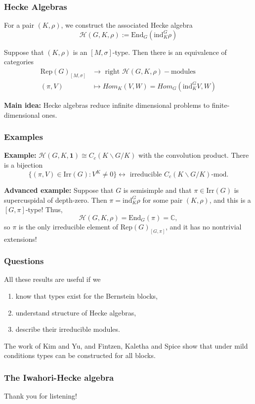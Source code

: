 \documentclass{beamer}
\newcommand{\Rep}{\mathrm{Rep}}
\newcommand{\Irr}{\mathrm{Irr}}
\newcommand{\End}{\mathrm{End}}
\newcommand{\ind}{\mathrm{ind}}
\newcommand{\CC}{\mathbb{C}}
\newcommand{\cH}{\mathcal{H}}
\theoremstyle{plain}
\begin{document}
\begin{frame}
    \frametitle{Hecke Algebras}
    For a pair $(K,\rho)$, we construct the associated Hecke algebra
    \[\cH(G,K,\rho):=\End_G(\ind_K^G\rho)\]
    \begin{theorem}
        Suppose that $(K,\rho)$ is an $[M,\sigma]$-type. Then there is an equivalence of categories 
        \begin{align*}
            \Rep(G)_{[M,\sigma]}&\longrightarrow\text{ right }\cH(G,K,\rho)-\text{modules}\\
            (\pi,V)&\longmapsto Hom_K(V,W)=Hom_G(\ind_K^G V,W)
        \end{align*}
    \end{theorem}
    \textbf{Main idea:} Hecke algebras reduce infinite dimensional problems to finite-dimensional ones.

\end{frame}

\begin{frame}
    \frametitle{Examples}
    \textbf{Example:} $\cH(G,K,\mathbf{1})\cong C_c(K\backslash G/K)$ with the convolution product. There is a bijection
    \[\{(\pi,V)\in\Irr(G):V^K\neq 0\}\longleftrightarrow \text{ irreducible }C_c(K\backslash G/K) \text{-mod.}\]
    \vspace{0.5cm}

    \textbf{Advanced example:} Suppose that $G$ is semisimple and that $\pi\in\Irr(G)$ is supercuspidal of depth-zero. Then $\pi=\ind_K^G\rho$ for some pair $(K,\rho)$, and this is a $[G,\pi]$-type! Thus,
    \[\cH(G,K,\rho)=\End_G(\pi)=\CC,\]
    so $\pi$ is the only irreducible element of $\Rep(G)_{[G,\pi]}$, and it has no nontrivial extensions!
\end{frame}

\begin{frame}
    \frametitle{Questions}
    All these results are useful if we
    \begin{enumerate}
        \item know that types exist for the Bernstein blocks,
        \item understand structure of Hecke algebras,
        \item describe their irreducible modules.
    \end{enumerate}
    The work of Kim and Yu, and Fintzen, Kaletha and Spice show that under mild conditions types can be constructed for all blocks.
\end{frame}


\begin{frame}
    \frametitle{The Iwahori-Hecke algebra}
\end{frame}


\begin{frame}
    Thank you for listening!
\end{frame}
\end{document}
